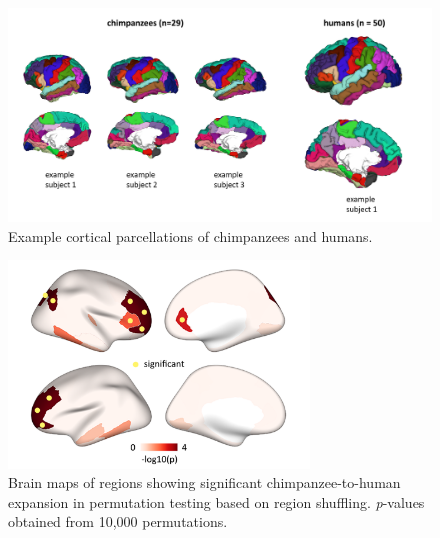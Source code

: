 \begin{refsection}
\begin{figure}[H]
    \centering
    \includegraphics[width=\linewidth]{images/harFigS12.png}
    \caption{Example cortical parcellations of chimpanzees and humans.}
    \label{harFigs12}
\end{figure}

\begin{figure}[H]
    \centering
    \includegraphics[width=8cm]{images/harFigS13.png}
    \caption{Brain maps of regions showing significant chimpanzee-to-human expansion in permutation testing based on region shuffling. \textit{p}-values obtained from 10,000 permutations.}
    \label{harFigs13}
\end{figure}


\end{refsection}
